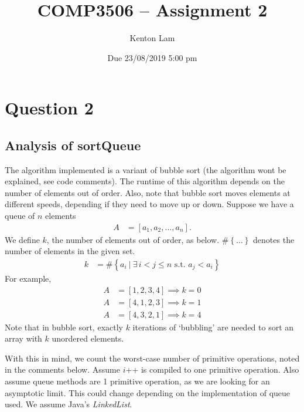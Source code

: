 \documentclass[11pt,a4paper]{article} %
\author{Kenton Lam}
\date{{Due 23/08/2019 5:00 pm}}
\title{COMP3506 -- Assignment 2}
\begin{document}
%

\setcounter{page}{1}
\maketitle
\section*{Question 2}
\subsection*{Analysis of {sortQueue}}

The algorithm implemented is a variant of bubble sort (the algorithm wont be
explained, see code comments). The runtime of this algorithm depends on the number
of elements out of order. Also, note that bubble sort moves elements at different speeds,
depending if they need to move up or down. Suppose we have a queue of $n$ elements
\begin{align*}
    A &= \left[ a_1, a_2, \ldots, a_n \right].
\end{align*}
We define $k$, the number of elements 
out of order, as below. $\# \left\{ \ldots\right\}$ denotes the number of elements in the given set.
\begin{align*}
    k &= \# \left\{a_i ~|~ \exists\, i < j \le n \text{ s.t. } a_j < a_i\right\}
\end{align*}
For example, 
\begin{align*}
    A &= \left[ 1, 2, 3, 4 \right] \implies k = 0 \\ 
    A &= \left[ 4, 1, 2, 3 \right] \implies k = 1 \\ 
    A &= \left[ 4, 3, 2, 1 \right] \implies k = 4
\end{align*}
Note that in bubble sort, exactly $k$ iterations of `bubbling' are needed to sort
an array with $k$ unordered elements.

With this in mind, we count the worst-case number of primitive operations,
noted in the comments below. Assume $i$++ is compiled to one primitive operation.
Also assume queue methods are 1 primitive operation, as we are looking for an asymptotic 
limit. This could change depending 
on the implementation of queue used. We assume Java's \textit{LinkedList}.
\end{document}
